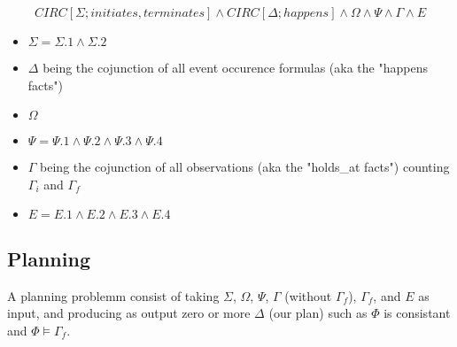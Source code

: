 \begin{equation}
  \tag{$\Phi$}
  CIRC[\Sigma;initiates,terminates] \land CIRC[\Delta;happens] \land \Omega \land \Psi \land \Gamma \land E
\end{equation}
\begin{itemize}
  \item $\Sigma = \Sigma.1 \land \Sigma.2$
  \item $\Delta$ being the cojunction of all event occurence formulas (aka the "happens facts")
  \item $\Omega$
  \item $\Psi = \Psi .1 \land \Psi .2 \land \Psi .3 \land \Psi .4$
  \item $\Gamma$ being the cojunction of all observations (aka the "holds\_at facts") counting $\Gamma_i$ and $\Gamma_f$
  \item $E = E.1 \land E.2 \land E.3 \land E.4$
\end{itemize}

\subsection{Planning}

A planning problemm consist of taking $\Sigma$, $\Omega$, $\Psi$, $\Gamma$ (without $\Gamma_f$), $\Gamma_f$, and $E$ as input,
and producing as output zero or more $\Delta$ (our plan) such as $\Phi$ is consistant and $\Phi\models\Gamma_f$.
